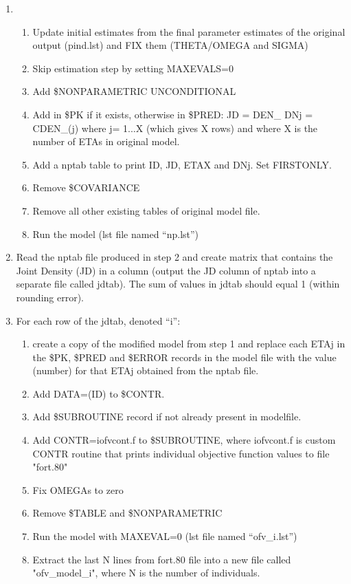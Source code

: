 \documentclass[a4paper,12pt]{article}
\begin{document}
\begin{enumerate}
\item
	\begin{enumerate}
		\item Update initial estimates from the final parameter estimates of the original output (pind.lst) and FIX them (THETA/OMEGA and SIGMA)
		\item Skip estimation step by setting MAXEVALS=0
		\item Add \$NONPARAMETRIC UNCONDITIONAL
		\item Add in \$PK if it exists, otherwise in \$PRED: 
	JD = DEN\_ 
	DNj = CDEN\_(j) 
	where j= 1...X (which gives X rows) and where X is the number of ETAs in original model.
		\item Add a nptab table to print ID, JD, ETAX and DNj. Set FIRSTONLY.
		\item Remove \$COVARIANCE
		\item Remove all other existing tables of original model file.
		\item Run the model	(lst file named “np.lst”)
	\end{enumerate}
\item Read the nptab file produced in step 2 and create matrix that contains the Joint Density (JD) in a column (output the JD column of nptab into a separate file called jdtab). The sum of values in jdtab should equal 1 (within rounding error).
\item For each row of the jdtab, denoted “i”:
	\begin{enumerate}
		\item create a copy of the modified model from step 1 and replace each ETAj in the \$PK, \$PRED and \$ERROR records in the model file with the value (number) for that ETAj obtained from the nptab file.
		\item Add DATA=(ID) to \$CONTR.
		\item Add \$SUBROUTINE record if not already present in modelfile.
		\item Add CONTR=iofvcont.f to \$SUBROUTINE, where iofvcont.f is custom CONTR 	routine that prints individual objective function values to file "fort.80"
		\item Fix OMEGAs to zero
		\item Remove \$TABLE and \$NONPARAMETRIC
		\item Run the model with MAXEVAL=0 (lst file named “ofv\_i.lst”)
		\item Extract the last N lines from fort.80 file into a new file called "ofv\_model\_i", where N is the number of individuals.

\end{enumerate}
\end{enumerate}
\end{document}
